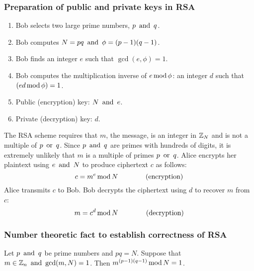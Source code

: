 \subsubsection*{Preparation of public and private keys in RSA}
\begin{enumerate}
    \item Bob selects two large prime numbers, $p \operatorname{~\text{and}~} q$.
    \item Bob computes $N = pq \operatorname{~\text{and}~} \phi = (p-1)(q-1)$.
    \item Bob finds an integer $e$ such that $\gcd(e, \phi) = 1$.
    \item Bob computes the multiplication inverse of $e \operatorname{\text{mod}} \phi$: an integer $d$ such that $(ed \operatorname{\text{mod}} \phi) = 1$.
    \item Public (encryption) key: $N \operatorname{~\text{and}~} e$.
    \item Private (decryption) key: $d$.
\end{enumerate}
The RSA scheme requires that $m$, the message, is an integer in $\mathbb{Z}_N$ and is not a multiple of $p \operatorname{~\text{or}~} q$. Since $p \operatorname{~\text{and}~} q$ are primes with hundreds of digits, it is extremely unlikely that $m$ is a multiple of primes $p \operatorname{~\text{or}~} q$. Alice encrypts her plaintext using $e \operatorname{~\text{and}~} N$ to produce ciphertext $c$ as follows:
\[
    c = m^e \operatorname{\text{mod}} N \qquad \qquad \text{(encryption)}
\]
Alice transmits $c$ to Bob. Bob decrypts the ciphertext using $d$ to recover $m$ from $c$:
\[
    m = c^d \operatorname{\text{mod}} N \qquad \qquad \text{(decryption)}
\]

\subsubsection*{Number theoretic fact to establish correctness of RSA}
Let $p \operatorname{~\text{and}~} q$ be prime numbers and $pq = N$. Suppose that $m \in \mathbb{Z}_n \operatorname{~\text{and}~} \gcd(m,N) = 1$. Then $m^{(p-1)(q-1)} \operatorname{\text{mod}} N = 1$.